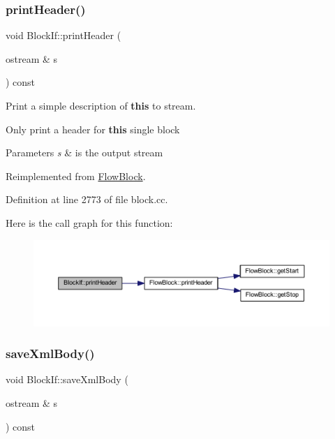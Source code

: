 \subsubsection{\texorpdfstring{printHeader()}{printHeader()}}
{\footnotesize\ttfamily void Block\+If\+::print\+Header (\begin{DoxyParamCaption}\item[{ostream \&}]{s }\end{DoxyParamCaption}) const\hspace{0.3cm}{\ttfamily [virtual]}}



Print a simple description of {\bfseries{this}} to stream. 

Only print a header for {\bfseries{this}} single block 
\begin{DoxyParams}{Parameters}
{\em s} & is the output stream \\
\hline
\end{DoxyParams}


Reimplemented from \mbox{\hyperlink{class_flow_block_a0d19c5b80186cf289dfbe0ce9e3ce37a}{Flow\+Block}}.



Definition at line 2773 of file block.\+cc.

Here is the call graph for this function\+:
\nopagebreak
\begin{figure}[H]
\begin{center}
\leavevmode
\includegraphics[width=350pt]{class_block_if_a6c45f688f991ec5f1412c51e56bf5fd3_cgraph}
\end{center}
\end{figure}
\mbox{\label{class_block_if_ae2abef245decb84faf212ce156389d9e}} 
\subsubsection{\texorpdfstring{saveXmlBody()}{saveXmlBody()}}
{\footnotesize\ttfamily void Block\+If\+::save\+Xml\+Body (\begin{DoxyParamCaption}\item[{ostream \&}]{s }\end{DoxyParamCaption}) const\hspace{0.3cm}{\ttfamily [virtual]}}



